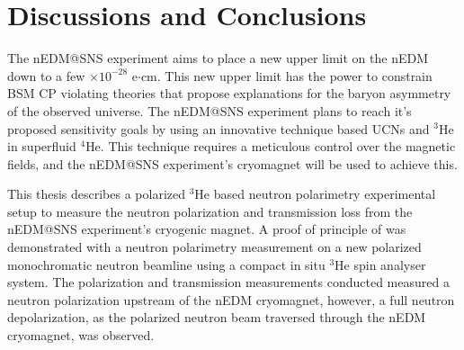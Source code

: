 \chapter{Discussions and Conclusions}
\label{ch:conclusions}

\ifpdf
    \graphicspath{{Chapter5/Figs/Raster/}{Chapter5/Figs/PDF/}{Chapter5/Figs/}}
\else
    \graphicspath{{Chapter5/Figs/Vector/}{Chapter5/Figs/}}
\fi

The nEDM@SNS experiment aims to place a new upper limit on the nEDM down to a few $\times 10^{-28}$ e$\cdot$cm. This new upper limit has the power to constrain BSM CP violating theories that propose explanations for the baryon asymmetry of the observed universe. The nEDM@SNS experiment plans to reach it's proposed sensitivity goals by using an innovative technique based UCNs and $^3$He in superfluid $^4$He. This technique requires a meticulous control over the magnetic fields, and the nEDM@SNS experiment's cryomagnet will be used to achieve this. 


This thesis describes a polarized $^3$He based neutron polarimetry experimental setup to measure the neutron polarization and transmission loss from the nEDM@SNS experiment's cryogenic magnet. A proof of principle of was demonstrated with a neutron polarimetry measurement on a new polarized monochromatic neutron beamline using a compact in situ $^3$He spin analyser system. The polarization and transmission measurements conducted measured a neutron polarization upstream of the nEDM cryomagnet, however, a full neutron depolarization, as the polarized neutron beam traversed through the nEDM cryomagnet, was observed. 

